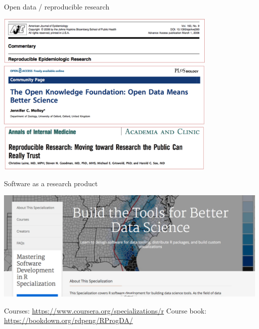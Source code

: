 \documentclass[ignorenonframetext,]{beamer}
\begin{document}
\begin{frame}{Open data / reproducible research}

\begin{center}\includegraphics[width=0.8\textwidth]{open_data_headlines} \end{center}

\end{frame}

\begin{frame}{Software as a research product}

\includegraphics[width=\textwidth]{coursera_screenshot}

Courses: \url{https://www.coursera.org/specializations/r} Course book:
\url{https://bookdown.org/rdpeng/RProgDA/}

\end{frame}
\end{document}
